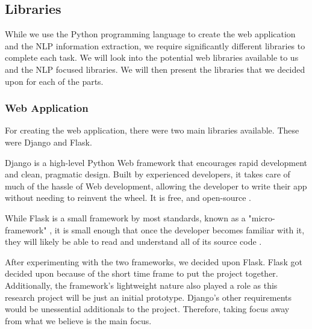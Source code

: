 	\subsection{Libraries}
	While we use the Python programming language to create the web application and the NLP information extraction, we require significantly different libraries to complete each task. We will look into the potential web libraries available to us and the NLP focused libraries. We will then present the libraries that we decided upon for each of the parts.
	
	\subsubsection{Web Application}
	For creating the web application, there were two main libraries available. These were Django and Flask.
	
	Django is a high-level Python Web framework that encourages rapid development and clean, pragmatic design. Built by experienced developers, it takes care of much of the hassle of Web development, allowing the developer to write their app without needing to reinvent the wheel. It is free, and open-source \cite{django}.
	
	While Flask is a small framework by most standards, known as a "micro-framework" \cite{flask_wp}, it is small enough that once the developer becomes familiar with it, they will likely be able to read and understand all of its source code \cite{grinberg2018flask}. 
	
	
	
	After experimenting with the two frameworks, we decided upon Flask. Flask got decided upon because of the short time frame to put the project together. Additionally, the framework's lightweight nature also played a role as this research project will be just an initial prototype. Django's other requirements would be unessential additionals to the project. Therefore, taking focus away from what we believe is the main focus.   
	
